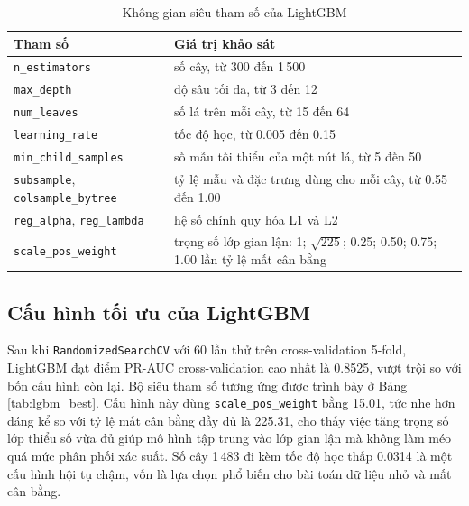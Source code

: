 \begin{table}[H]
\centering
\fontsize{11}{13.6}\selectfont
\renewcommand{\arraystretch}{1.2}
\setlength{\tabcolsep}{6pt}
\begin{tabularx}{\textwidth}{|p{4.8cm}|X|}
\hline
\textbf{Tham số} & \textbf{Giá trị khảo sát} \\
\hline
\texttt{n\_estimators} & số cây, từ 300 đến 1\,500 \\
\hline
\texttt{max\_depth} & độ sâu tối đa, từ 3 đến 12 \\
\hline
\texttt{num\_leaves} & số lá trên mỗi cây, từ 15 đến 64 \\
\hline
\texttt{learning\_rate} & tốc độ học, từ 0{.}005 đến 0{.}15 \\
\hline
\texttt{min\_child\_samples} & số mẫu tối thiểu của một nút lá, từ 5 đến 50 \\
\hline
\texttt{subsample}, \texttt{colsample\_bytree} & tỷ lệ mẫu và đặc trưng dùng cho mỗi cây, từ 0{.}55 đến 1{.}00 \\
\hline
\texttt{reg\_alpha}, \texttt{reg\_lambda} & hệ số chính quy hóa L1 và L2 \\
\hline
\texttt{scale\_pos\_weight} & trọng số lớp gian lận: 1; $\sqrt{225}$; 0{.}25; 0{.}50; 0{.}75; 1{.}00 lần tỷ lệ mất cân bằng \\
\hline
\end{tabularx}
\caption{Không gian siêu tham số của LightGBM}
\label{tab:lgbm_params}
\end{table}

\subsection{Cấu hình tối ưu của LightGBM}
Sau khi \texttt{RandomizedSearchCV} với 60 lần thử trên cross-validation 5-fold, LightGBM đạt điểm PR-AUC cross-validation cao nhất là 0{.}8525, vượt trội so với bốn cấu hình còn lại. Bộ siêu tham số tương ứng được trình bày ở Bảng \ref{tab:lgbm_best}. Cấu hình này dùng \texttt{scale\_pos\_weight} bằng 15{.}01, tức nhẹ hơn đáng kể so với tỷ lệ mất cân bằng đầy đủ là 225{.}31, cho thấy việc tăng trọng số lớp thiểu số vừa đủ giúp mô hình tập trung vào lớp gian lận mà không làm méo quá mức phân phối xác suất. Số cây 1\,483 đi kèm tốc độ học thấp 0{.}0314 là một cấu hình hội tụ chậm, vốn là lựa chọn phổ biến cho bài toán dữ liệu nhỏ và mất cân bằng.

